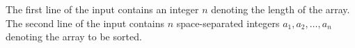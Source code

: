 The first line of the input contains an integer $n$ denoting the length of the array.
The second line of the input contains $n$ space-separated integers $a_1,a_2,\ldots,a_n$ denoting the array to be sorted.